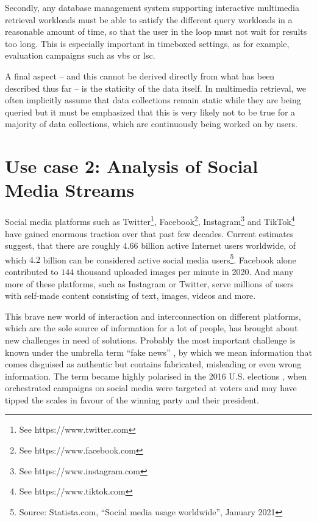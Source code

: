 Secondly, any database management system supporting interactive multimedia retrieval workloads must be able to satisfy the different query workloads in a reasonable amount of time, so that the user in the loop must not wait for results too long. This is especially important in timeboxed settings, as for example, evaluation campaigns such as \acrshort{vbs} or \acrshort{lsc}.

A final aspect -- and this cannot be derived directly from what has been described thus far -- is the staticity of the data itself. In multimedia retrieval, we often implicitly assume that data collections remain static while they are being queried but it must be emphasized that this is very likely not to be true for a majority of data collections, which are continuously being worked on by users. 

\section{Use case 2: Analysis of Social Media Streams}
\label{section:application_online_analysis}

Social media platforms such as Twitter\footnote{See https://www.twitter.com}, Facebook\footnote{See https://www.facebook.com}, Instagram\footnote{See https://www.instagram.com} and TikTok\footnote{See https://www.tiktok.com} have gained enormous traction over that past few decades. Current estimates suggest, that there are roughly $4.66$ billion active Internet users worldwide, of which $4.2$ billion can be considered active social media users\footnote{Source: Statista.com, ``Social media usage worldwide'', January 2021}. Facebook alone contributed to $144$ thousand uploaded images per minute in 2020. And many more of these  platforms, such as Instagram or Twitter, serve millions of users with self-made content consisting of text, images, videos and more.

This brave new world of interaction and interconnection on different platforms, which are the sole source of information for a lot of people, has brought about new challenges in need of solutions. Probably the most important challenge is known under the umbrella term ``fake news'' \cite{Lazer:2018Science}, by which we mean information that comes disguised as authentic but contains fabricated, misleading or even wrong information. The term became highly polarised in the 2016 U.S. elections \cite{Quandt:2019Fake}, when orchestrated campaigns on social media were targeted at voters and may have tipped the scales in favour of the winning party and their president.

